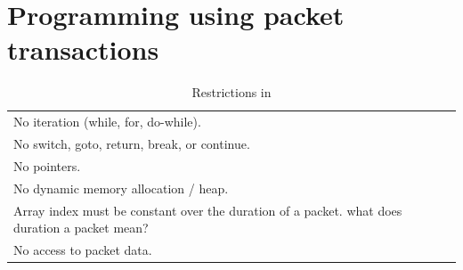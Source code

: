 \section{Programming using packet transactions}
\label{s:transactions}

\begin{table}
  \begin{tabular}{p{}}
    No iteration (while, for, do-while).\\
    No switch, goto, return, break, or continue.\\
    No pointers.\\
    No dynamic memory allocation / heap.\\
    Array index must be constant over the duration of a packet. \ac{what does
    duration a packet mean?}\\
    No access to packet data.\\
  \end{tabular}
  \caption{Restrictions in \pktlanguage}
  \label{tab:restrict}
\end{table}
